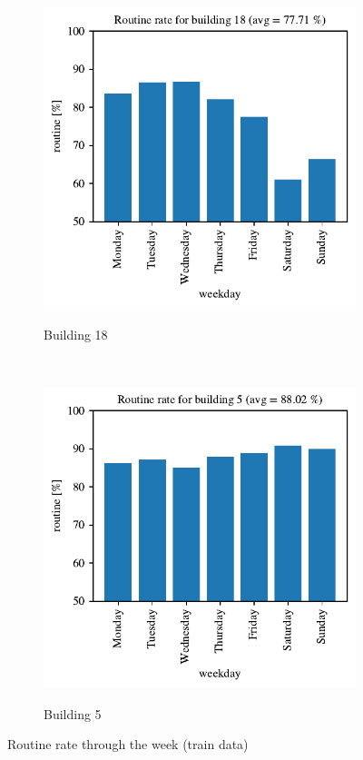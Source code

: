 \begin{figure}[H]
    \begin{subfigure}{.5\textwidth}
		\caption{Building 18}
		\includegraphics[width=1\linewidth]{../Figures/EC/b18week.pdf}
		\label{fig:ec_b18week}
	\end{subfigure}%
    ~ 
    \begin{subfigure}{.5\textwidth}
		\caption{Building 5}
		\includegraphics[width=1\linewidth]{../Figures/EC/b5week.pdf}
		\label{fig:ec_b5week}
	\end{subfigure}%
	\caption{Routine rate through the week (train data)}
    \label{fig:ec_week}
\end{figure}


